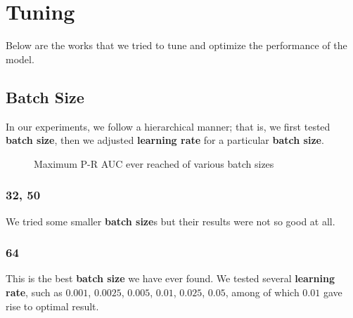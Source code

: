 \documentclass[
]{article}
\begin{document}
\hypertarget{tuning}{%
\section{Tuning}\label{tuning}}

Below are the works that we tried to tune and optimize the performance
of the model.

\hypertarget{batch-size}{%
\subsection{Batch Size}\label{batch-size}}

In our experiments, we follow a hierarchical manner; that is, we first
tested \textbf{batch size}, then we adjusted \textbf{learning rate} for
a particular \textbf{batch size}.

\begin{figure}[htbp]
\centering
{}
\caption{Maximum P-R AUC ever reached of various batch sizes}
\end{figure}

\hypertarget{section}{%
\subsubsection{32, 50}\label{section}}

We tried some smaller \textbf{batch size}s but their results were not so
good at all.

\hypertarget{section-1}{%
\subsubsection{64}\label{section-1}}

This is the best \textbf{batch size} we have ever found. We tested
several \textbf{learning rate}, such as \(0.001\), \(0.0025\),
\(0.005\), \(0.01\), \(0.025\), \(0.05\), among of which \(0.01\) gave
rise to optimal result.
\end{document}

